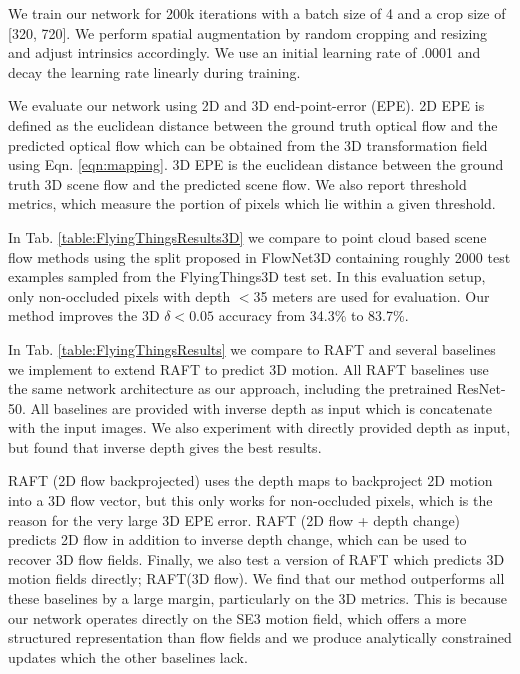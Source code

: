 \documentclass[final]{cvpr}
\begin{document}
We train our network for 200k iterations with a batch size of 4 and a crop size of [320, 720]. We perform spatial augmentation by random cropping and resizing and adjust intrinsics accordingly. We use an initial learning rate of .0001 and decay the learning rate linearly during training. 

We evaluate our network using 2D and 3D end-point-error (EPE). 2D EPE is defined as the euclidean distance between the ground truth optical flow and the predicted optical flow which can be obtained from the 3D transformation field using Eqn. \ref{eqn:mapping}. 3D EPE is the euclidean distance between the ground truth 3D scene flow and the predicted scene flow. We also report threshold metrics, which measure the portion of pixels which lie within a given threshold.

In Tab. \ref{table:FlyingThingsResults3D} we compare to point cloud based scene flow methods\cite{liu2019flownet3d,wang2020flownet3d++,puy20flot} using the split proposed in FlowNet3D\cite{liu2019flownet3d} containing roughly 2000 test examples sampled from the FlyingThings3D test set. In this evaluation setup, only non-occluded pixels with depth $<$35 meters are used for evaluation. Our method improves the 3D $\delta<0.05$ accuracy from 34.3\% to 83.7\%.

In Tab. \ref{table:FlyingThingsResults} we compare to RAFT\cite{teed2020raft} and several baselines we implement to extend RAFT to predict 3D motion. All RAFT baselines use the same network architecture as our approach, including the pretrained ResNet-50. All baselines are provided with inverse depth as input which is concatenate with the input images. We also experiment with directly provided depth as input, but found that inverse depth gives the best results.

RAFT (2D flow backprojected) uses the depth maps to backproject 2D motion into a 3D flow vector, but this only works for non-occluded pixels, which is the reason for the very large 3D EPE error. RAFT (2D flow + depth change) predicts 2D flow in addition to inverse depth change, which can be used to recover 3D flow fields. Finally, we also test a version of RAFT which predicts 3D motion fields directly; RAFT(3D flow). We find that our method outperforms all these baselines by a large margin, particularly on the 3D metrics. This is because our network operates directly on the SE3 motion field, which offers a more structured representation than flow fields and we produce analytically constrained updates which the other baselines lack.
\end{document}
